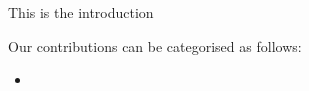 This is the introduction



 Our contributions can be categorised as follows: 
\begin{itemize}
\item
\end{itemize}



